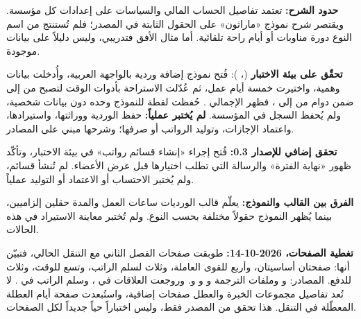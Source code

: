 \textbf{حدود الشرح:} تعتمد تفاصيل الحساب المالي والسياسات على إعدادات كل مؤسسة.
ويقتصر شرح نموذج «ماراثون» على الحقول الثابتة في المصدر؛ فلم تُستنتج من اسم النوع
دورة مناوبات أو أيام راحة تلقائية. أما مثال الأفق فتدريبي، وليس دليلاً على بيانات موجودة.

\textbf{تحقّق على بيئة الاختبار} (، ): فُتح نموذج
إضافة وردية بالواجهة العربية، وأُدخلت بيانات وهمية، واختيرت خمسة أيام عمل، ثم عُدّلت
الاستراحة بأدوات الوقت لتصبح من  إلى  ضمن دوام من  إلى
، فظهر الإجمالي . حُفظت لقطة للنموذج وحده دون بيانات شخصية،
ولم يُحفظ السجل في المؤسسة. \textbf{لم يُختبر عملياً:} حفظ الوردية ووراثتها،
واستيرادها، واعتماد الإجازات، وتوليد الرواتب أو صرفها؛ وشرحها مبني على المصادر.

\textbf{تحقق إضافي للإصدار 0.3:} فُتح إجراء «إنشاء قسائم رواتب» في بيئة
الاختبار، وتأكّد ظهور «نهاية الفترة» والرسالة التي تطلب اختيارها قبل عرض الأعضاء.
لم تُنشأ قسائم، ولم يُختبر الاحتساب أو الاعتماد أو التوليد عملياً.

\textbf{الفرق بين القالب والنموذج:} يعلّم قالب الورديات ساعات العمل والمدة حقلين إلزاميين،
بينما يُظهر النموذج حقولاً مختلفة بحسب النوع. ولم تُختبر معاينة الاستيراد في هذه الحالات.


\textbf{تغطية الصفحات، 2026-10-14:} طوبقت صفحات الفصل الثاني مع التنقل الحالي، فتبيّن أنها: صفحتان أساسيتان، وأربع للقوى العاملة، وثلاث لسلم الراتب، وتسع للوقت، وثلاث للدفع. المصادر:  و وملفات الترجمة  و و و. وروجعت العلاقات في ، وسلم الراتب في . لا تُعد تفاصيل مجموعات الخبرة والعطل صفحات إضافية، واستُبعدت صفحة أيام العطلة المعطّلة في التنقل. هذا تحقق من المصدر فقط، وليس اختباراً حياً جديداً لكل الصفحات.

